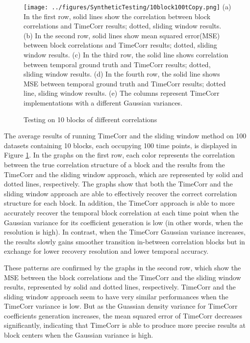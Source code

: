 \documentclass[11pt]{article}
\begin{document}
\begin{figure}[!htb]
\caption{Testing on 10 blocks of different correlations}
\texttt{[image: ../figures/SyntheticTesting/10block100tCopy.png]}
\label{fig:10block100t}
(a) In the first row, solid lines show the correlation between block correlations and TimeCorr results; dotted, sliding window results. (b) In the second row, solid lines show mean squared error(MSE) between block correlations and TimeCorr results; dotted, sliding window results. (c) In the third row, the solid line shows correlation between temporal ground truth and TimeCorr results; dotted, sliding window results. (d) In the fourth row, the solid line shows MSE between temporal ground truth and TimeCorr results; dotted line, sliding window results. (e) The columns represent TimeCorr implementations with a different Gaussian variances.
\end{figure}

The average results of running TimeCorr and the sliding window method on 100 datasets containing 10 blocks, each occupying 100 time points, is displayed in Figure \ref{fig:10block100t}. In the graphs on the first row, each color represents the correlation between the true correlation structure of a block and the results from the TimeCorr and the sliding window approach, which are represented by solid and dotted lines, respectively. The graphs show that both the TimeCorr and the sliding window approach are able to effectively recover the correct correlation structure for each block. In addition, the TimeCorr approach is able to more accurately recover the temporal block correlation at each time point when the Gaussian variance for its coefficient generation is low (in other words, when the resolution is high). In contrast, when the TimeCorr Gaussian variance increases, the results slowly gains smoother transition in-between correlation blocks but in exchange for lower recovery resolution and lower temporal accuracy.

These patterns are confirmed by the graphs in the second row, which show the MSE between the block correlations and the TimeCorr and the sliding window results, represented by solid and dotted lines, respectively. TimeCorr and the sliding window approach seem to have very similar performances when the TimeCorr variance is low. But as the Guassian density variance for TimeCorr coefficients generation increases, the mean squared error of TimeCorr decreases significantly, indicating that TimeCorr is able to produce more precise results at block centers when the Gaussian variance is high.
\end{document}
